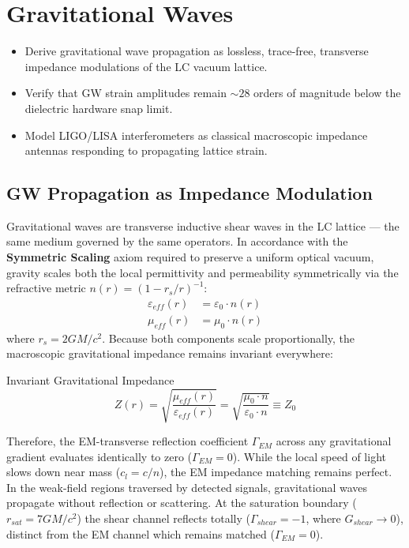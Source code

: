 
\chapter{Gravitational Waves}
\label{ch:gravitational_waves}


\begin{objectivebox}
\begin{itemize}
    \item Derive gravitational wave propagation as lossless, trace-free, transverse impedance modulations of the LC vacuum lattice.
    \item Verify that GW strain amplitudes remain $\sim 28$ orders of magnitude below the dielectric hardware snap limit.
    \item Model LIGO/LISA interferometers as classical macroscopic impedance antennas responding to propagating lattice strain.
\end{itemize}
\end{objectivebox}

\section{GW Propagation as Impedance Modulation}
\label{sec:gw_propagation}

Gravitational waves are transverse inductive shear waves in the LC
lattice --- the same medium governed by the same operators. In accordance with the \textbf{Symmetric Scaling} axiom required to preserve a uniform optical vacuum, gravity scales both the local permittivity and permeability symmetrically via the refractive metric $n(r) = (1 - r_s/r)^{-1}$:
\begin{align}
    \varepsilon_{eff}(r) &= \varepsilon_0 \cdot n(r) \\
    \mu_{eff}(r) &= \mu_0 \cdot n(r)
\end{align}
where $r_s = 2GM/c^2$. Because both components scale proportionally, the macroscopic gravitational impedance remains invariant everywhere:
\begin{resultbox}{Invariant Gravitational Impedance}
\begin{equation}
    Z(r) = \sqrt{\frac{\mu_{eff}(r)}{\varepsilon_{eff}(r)}} = \sqrt{\frac{\mu_0 \cdot n}{\varepsilon_0 \cdot n}} \equiv Z_0
    \label{eq:Z_grav}
\end{equation}
\end{resultbox}
Therefore, the EM-transverse reflection coefficient $\Gamma_{EM}$ across any gravitational gradient evaluates identically to zero ($\Gamma_{EM} = 0$). While the local speed of light slows down near mass ($c_l = c/n$), the EM impedance matching remains perfect. In the weak-field regions traversed by detected signals, gravitational waves propagate without reflection or scattering. At the saturation boundary ($r_{sat} = 7GM/c^2$) the shear channel reflects totally ($\Gamma_{shear} = -1$, where $G_{shear} \to 0$), distinct from the EM channel which remains matched ($\Gamma_{EM} = 0$).


